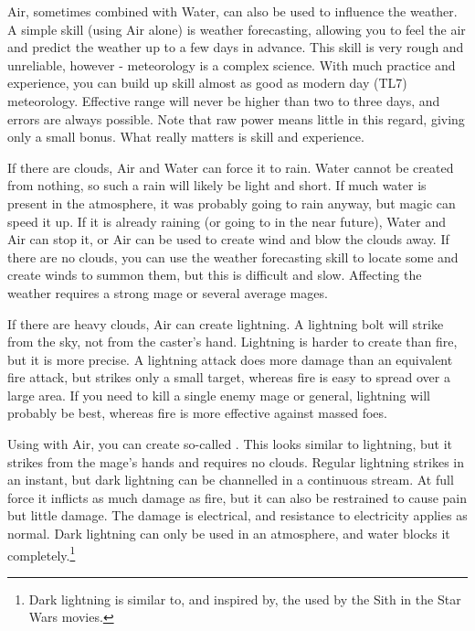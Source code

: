 Air, sometimes combined with Water, can also be used to influence the weather. A simple skill (using Air alone) is weather forecasting, allowing you to feel the air and predict the weather up to a few days in advance. This skill is very rough and unreliable, however - meteorology is a complex science. With much practice and experience, you can build up skill almost as good as modern day (TL7) meteorology. Effective range will never be higher than two to three days, and errors are always possible. Note that raw power means little in this regard, giving only a small bonus. What really matters is skill and experience. 

If there are clouds, Air and Water can force it to rain. Water cannot be created from nothing, so such a rain will likely be light and short. If much water is present in the atmosphere, it was probably going to rain anyway, but magic can speed it up. If it is already raining (or going to in the near future), Water and Air can stop it, or Air can be used to create wind and blow the clouds away. If there are no clouds, you can use the weather forecasting skill to locate some and create winds to summon them, but this is difficult and slow. Affecting the weather requires a strong mage or several average mages. 

If there are heavy clouds, Air can create lightning. A lightning bolt will strike from the sky, not from the caster's hand. Lightning is harder to create than fire, but it is more precise. A lightning attack does more damage than an equivalent fire attack, but strikes only a small target, whereas fire is easy to spread over a large area. If you need to kill a single enemy mage or general, lightning will probably be best, whereas fire is more effective against massed foes. 

Using \Itzach{} with Air, you can create so-called . This looks similar to lightning, but it strikes from the mage's hands and requires no clouds. Regular lightning strikes in an instant, but dark lightning can be channelled in a continuous stream. At full force it inflicts as much damage as fire, but it can also be restrained to cause pain but little damage. The damage is electrical, and resistance to electricity applies as normal. Dark lightning can only be used in an atmosphere, and water blocks it completely.\footnote{Dark lightning is similar to, and inspired by, the  used by the Sith in the Star Wars movies.} 

